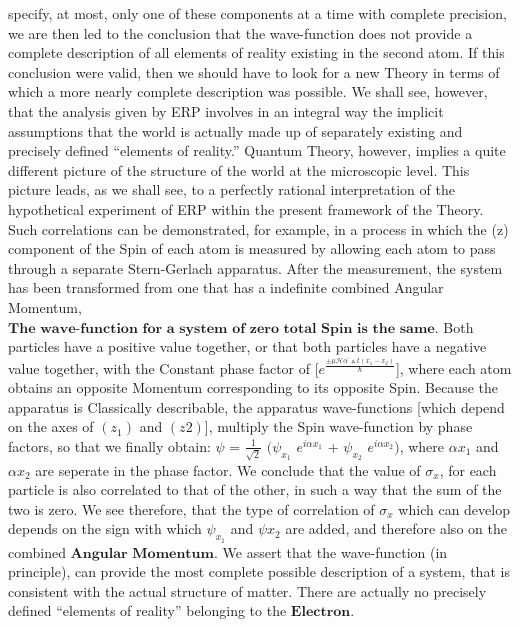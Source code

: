 \documentclass[a4paper, 10pt, onepage]{elegantbook}
\begin{document}
{specify, at most, only one of these components at a time with complete precision, we are then led to the conclusion 
that the wave-function does not provide a complete description of all elements of reality existing in the second atom.
If this conclusion were valid, then we should have to look for a new Theory in terms of which a more nearly complete 
description was possible. We shall see, however, that the analysis given by ERP involves in an integral way the 
implicit assumptions that the world is actually made up of separately existing and precisely defined “elements of 
reality.” Quantum Theory, however, implies a quite different picture of the structure of the world at the microscopic 
level. This picture leads, as we shall see, to a perfectly rational interpretation of the hypothetical experiment of 
ERP within the present framework of the Theory. Such correlations can be demonstrated, for example, in a process in 
which the (z) component of the Spin of each atom is measured by allowing each atom to pass through a separate 
Stern-Gerlach apparatus. After the measurement, the system has been transformed from one that has a indefinite combined 
Angular Momentum, $\mathbf{\textbf{The wave-function for a system of zero total Spin is the same}}$. Both particles 
have a positive value together, or that both particles have a negative value together, with the Constant phase factor 
of [$e^\frac{\pm \mu \mathscr H \alpha^{\prime} \vartriangle t(x_1 - x_2)}{\hbar}$], where each atom obtains an 
opposite Momentum corresponding to its opposite Spin. Because the apparatus is Classically describable, the apparatus 
wave-functions [which depend on the axes of $(z_1)$ and $(z2)$], multiply the Spin wave-function by phase factors, so 
that we finally obtain: $\psi$ = $\frac{1}{\sqrt 2}$ $(\psi_{x_1}$ $e^{i \alpha x_1 }$ + $\psi _{x_2}$ $e^{i \alpha 
x_2})$, where $\alpha x_1$ and $\alpha x_2$ are seperate in the phase factor. We conclude that the value of $\sigma_x$, 
for each particle is also correlated to that of the other, in such a way that the sum of the two is zero. We see 
therefore, that the type of correlation of $\sigma_x$ which can develop depends on the sign with which $\psi_{x_1}$ and 
$\psi{x_2}$ are added, and therefore also on the combined $\mathbf{\textbf{Angular Momentum}}$.
We assert that the wave-function (in principle), can provide the most complete possible description of a system,
that is consistent with the actual structure of matter.
There are actually no precisely defined “elements of reality” belonging to the $\mathbf{\textbf{Electron}}$.
}
\end{document}
